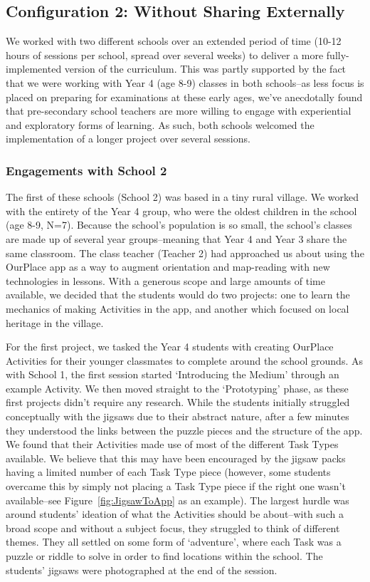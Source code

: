 \documentclass[,hyphens]{sigchi}
\begin{document}
\subsection{Configuration 2: Without Sharing Externally}
We worked with two different schools over an extended period of time (10-12 hours of sessions per school, spread over several weeks) to deliver a more fully-implemented version of the curriculum. This was partly supported by the fact that we were working with Year 4 (age 8-9) classes in both schools--as less focus is placed on preparing for examinations at these early ages, we've anecdotally found that pre-secondary school teachers are more willing to engage with experiential and exploratory forms of learning. As such, both schools welcomed the implementation of a longer project over several sessions.

\subsubsection{Engagements with School 2}
The first of these schools (School 2) was based in a tiny rural village. We worked with the entirety of the Year 4 group, who were the oldest children in the school (age 8-9, N=7). Because the school's population is so small, the school's classes are made up of several year groups--meaning that Year 4 and Year 3 share the same classroom. The class teacher (Teacher 2) had approached us about using the OurPlace app as a way to augment orientation and map-reading with new technologies in lessons. With a generous scope and large amounts of time available, we decided that the students would do two projects: one to learn the mechanics of making Activities in the app, and another which focused on local heritage in the village. 

For the first project, we tasked the Year 4 students with creating OurPlace Activities for their younger classmates to complete around the school grounds. As with School 1, the first session started `Introducing the Medium' through an example Activity. We then moved straight to the `Prototyping' phase, as these first projects didn't require any research. While the students initially struggled conceptually with the jigsaws due to their abstract nature, after a few minutes they understood the links between the puzzle pieces and the structure of the app. We found that their Activities made use of most of the different Task Types available. We believe that this may have been encouraged by the jigsaw packs having a limited number of each Task Type piece (however, some students overcame this by simply not placing a Task Type piece if the right one wasn't available--see Figure~\ref{fig:JigsawToApp} as an example). The largest hurdle was around students' ideation of what the Activities should be about--with such a broad scope and without a subject focus, they struggled to think of different themes. They all settled on some form of `adventure', where each Task was a puzzle or riddle to solve in order to find locations within the school. The students' jigsaws were photographed at the end of the session.
\end{document}
